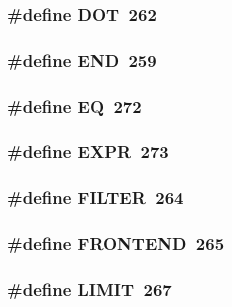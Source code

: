 \subsubsection[{DOT}]{\setlength{\rightskip}{0pt plus 5cm}\#define DOT~262}\label{rules_8h_8a5043e7ab655e37e903ffbd8b95d6b2}


\subsubsection[{END}]{\setlength{\rightskip}{0pt plus 5cm}\#define END~259}\label{rules_8h_29fd18bed01c4d836c7ebfe73a125c3f}


\subsubsection[{EQ}]{\setlength{\rightskip}{0pt plus 5cm}\#define EQ~272}\label{rules_8h_baab8d42f075ee8ddc9b70951d3fd6cd}


\subsubsection[{EXPR}]{\setlength{\rightskip}{0pt plus 5cm}\#define EXPR~273}\label{rules_8h_3102a3792f55f3ad5ff10f5fe3a6ce79}


\subsubsection[{FILTER}]{\setlength{\rightskip}{0pt plus 5cm}\#define FILTER~264}\label{rules_8h_3a9cb517ac5b9aeae4caa398a0ed07cd}


\subsubsection[{FRONTEND}]{\setlength{\rightskip}{0pt plus 5cm}\#define FRONTEND~265}\label{rules_8h_c2bbe3e4ec807db4fbf3306f51eaa4d6}


\subsubsection[{LIMIT}]{\setlength{\rightskip}{0pt plus 5cm}\#define LIMIT~267}\label{rules_8h_5977928b042d0a4b2ce93baa979e5f5c}


